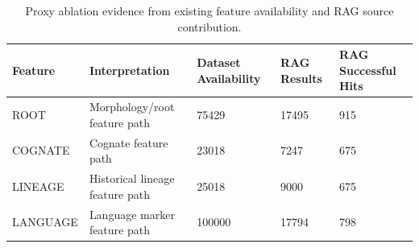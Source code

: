 \begin{table}[ht]
\centering
\caption{Proxy ablation evidence from existing feature availability and RAG source contribution.}
\label{tab:ablation\_proxy}
\begin{tabular}{lllll}
\hline
Feature & Interpretation & Dataset Availability & RAG Results & RAG Successful Hits \\
\hline
ROOT & Morphology/root feature path & 75429 & 17495 & 915 \\
COGNATE & Cognate feature path & 23018 & 7247 & 675 \\
LINEAGE & Historical lineage feature path & 25018 & 9000 & 675 \\
LANGUAGE & Language marker feature path & 100000 & 17794 & 798 \\
\hline
\end{tabular}
\end{table}

